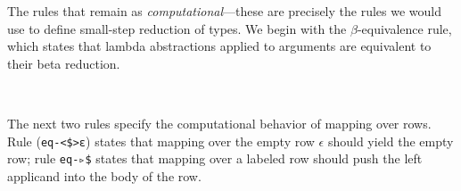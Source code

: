 \documentclass[authoryear, acmsmall, screen, review, nonacm]{acmart}
\begin{document}
The rules that remain as \emph{computational}---these are precisely the rules we would use to define small-step reduction of types. We begin with the $\beta$-equivalence rule, which states that lambda abstractions applied to arguments are equivalent to their beta reduction.


\begin{code}%
%
\>[2]\AgdaSpace{}%
\AgdaSymbol{:}\AgdaSpace{}%
\AgdaSpace{}%
\AgdaSymbol{\{}\AgdaSpace{}%
\AgdaSymbol{:}\AgdaSpace{}%
\AgdaSpace{}%
\AgdaSymbol{(}\AgdaSpace{}%
\AgdaOperator{\AgdaInductiveConstructor{,,}}\AgdaSpace{}%
\AgdaSymbol{)}\AgdaSpace{}%
\AgdaSymbol{\}}\AgdaSpace{}%
\AgdaSymbol{\{}\AgdaSpace{}%
\AgdaSymbol{:}\AgdaSpace{}%
\AgdaSpace{}%
\AgdaSpace{}%
\AgdaSymbol{\}}\AgdaSpace{}%
\<%
\\
\>[2][@{}l@{\AgdaIndent{0}}]%
\>[4]\AgdaSymbol{((}\AgdaSpace{}%
\AgdaSymbol{)}\AgdaSpace{}%
\AgdaSpace{}%
\AgdaSymbol{)}\AgdaSpace{}%
\AgdaSpace{}%
\AgdaSymbol{(}\AgdaSpace{}%
\AgdaOperator{\AgdaFunction{βₖ[}}\AgdaSpace{}%
\AgdaSpace{}%
\AgdaOperator{\AgdaFunction{]}}\AgdaSymbol{)}\<%
\end{code}

The next two rules specify the computational behavior of mapping over rows. Rule (\verb!eq-<$>ε!) states that mapping over the empty row $\epsilon$ should yield the empty row; rule \verb!eq-▹$! states that mapping over a labeled row should push the left applicand into the body of the row.
\end{document}
